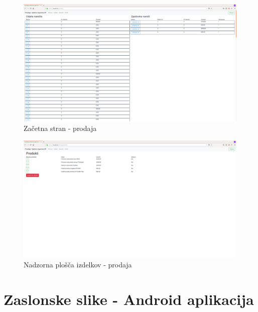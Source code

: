 \documentclass[a4paper,12pt]{report}
\begin{document}
\begin{figure}[h]
    \centering
    \includegraphics[width=\linewidth]{slike/splet/prodajalec_index.png}
    \caption{Začetna stran - prodaja}
    \label{fig:index_prodajalec}
\end{figure}

\begin{figure}[h]
    \centering
    \includegraphics[width=\linewidth]{slike/splet/prodajalec_produkti.png}
    \caption{Nadzorna plošča izdelkov - prodaja}
    \label{fig:products_prodajalec}
\end{figure}
\chapter{Zaslonske slike - Android aplikacija}
\end{document}
